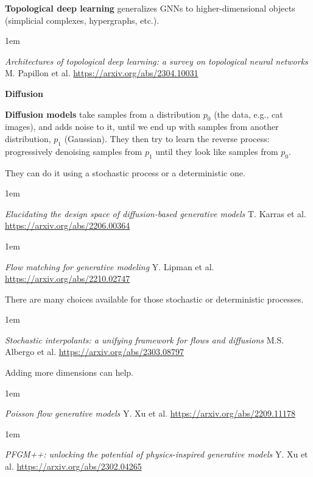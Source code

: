 \documentclass[a5paper]{article}
\let\d\textbf
\newenvironment{reference}{%
  \medskip\goodbreak
  \parskip 0pt
  \raggedright
  \leftskip 1em
  \obeylines
}{\par\medskip\goodbreak}
\def\subsection#1{{\par\bigskip\goodbreak\large\bfseries #1\par}}
\begin{document}
\d{Topological deep learning}
generalizes GNNs to higher-dimensional objects (simplicial complexes, hypergraphs, etc.).

\begin{reference}
  \emph{Architectures of topological deep learning: a survey on topological neural networks}
  M. Papillon et al.
  \url{https://arxiv.org/abs/2304.10031}
\end{reference}

\subsection{Diffusion}

\d{Diffusion models} take samples from a distribution $p_0$ (the data, e.g., cat images),
and adds noise to it, until we end up with samples from another distribution, $p_1$ (Gaussian).
They then try to learn the reverse process: progressively denoising samples from $p_1$
until they look like samples from $p_0$.

They can do it using a stochastic process or a deterministic one.

\begin{reference}
  \emph{Elucidating the design space of diffusion-based generative models}
  T. Karras et al.
  \url{https://arxiv.org/abs/2206.00364}
\end{reference}

\begin{reference}
  \emph{Flow matching for generative modeling}
  Y. Lipman et al.
  \url{https://arxiv.org/abs/2210.02747}
\end{reference}

There are many choices available for those stochastic or deterministic processes.

\begin{reference}
  \emph{Stochastic interpolants: a unifying framework for flows and diffusions}
  M.S. Albergo et al.
  \url{https://arxiv.org/abs/2303.08797}
\end{reference}

Adding more dimensions can help.

\begin{reference}
  \emph{Poisson flow generative models}
  Y. Xu et al.
  \url{https://arxiv.org/abs/2209.11178}
\end{reference}

\begin{reference}
  \emph{PFGM++: unlocking the potential of physics-inspired generative models}
  Y. Xu et al.
  \url{https://arxiv.org/abs/2302.04265}
\end{reference}
\end{document}
